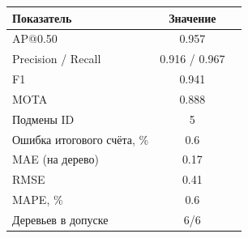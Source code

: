 \begin{tabular}{lcc}
\hline
Показатель & Значение \\
\hline
AP@0.50 & 0.957 \\
Precision / Recall & 0.916 / 0.967 \\
F1 & 0.941 \\
MOTA & 0.888 \\
Подмены ID & 5 \\
Ошибка итогового счёта, \% & 0.6 \\
MAE (на дерево) & 0.17 \\
RMSE & 0.41 \\
MAPE, \% & 0.6 \\
Деревьев в допуске & 6/6 \\
\hline
\end{tabular}
